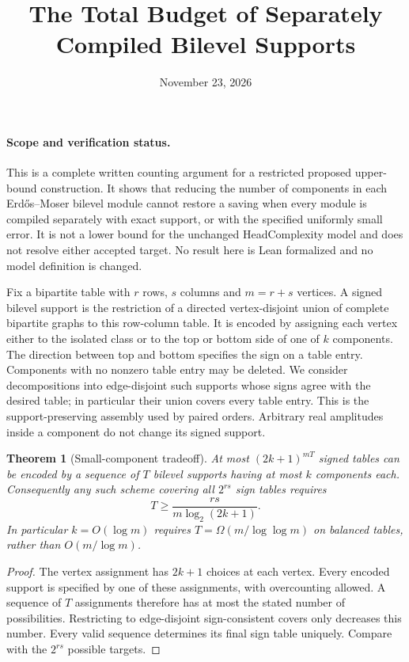 \documentclass[11pt]{article}
\title{The Total Budget of Separately Compiled Bilevel Supports}
\author{}
\date{November 23, 2026}
\newtheorem{theorem}{Theorem}
\begin{document}
\maketitle

\paragraph{Scope and verification status.}
This is a complete written counting argument for a restricted proposed
upper-bound construction. It shows that reducing the number of components
in each Erd\H{o}s--Moser bilevel module cannot restore a saving when every
module is compiled separately with exact support, or with the specified
uniformly small error. It is not a lower bound for the unchanged
HeadComplexity model and does not resolve either accepted target.
No result here is Lean formalized and no model definition is changed.

Fix a bipartite table with $r$ rows, $s$ columns and $m=r+s$ vertices.
A signed bilevel support is the restriction of a directed vertex-disjoint
union of complete bipartite graphs to this row-column table. It is encoded
by assigning each vertex either to the isolated class or to the top or
bottom side of one of $k$ components. The direction between top and bottom
specifies the sign on a table entry. Components with no nonzero table
entry may be deleted. We consider decompositions into edge-disjoint such
supports whose signs agree with the desired table; in particular their
union covers every table entry. This is the support-preserving assembly
used by paired orders. Arbitrary real amplitudes inside a component do
not change its signed support.

\begin{theorem}[Small-component tradeoff]
At most $(2k+1)^{mT}$ signed tables can be encoded by a sequence of $T$
bilevel supports having at most $k$ components each. Consequently any such
scheme covering all $2^{rs}$ sign tables requires
\[
 T\geq \frac{rs}{m\log_2(2k+1)}.
\]
In particular $k=O(\log m)$ requires $T=\Omega(m/\log\log m)$ on
balanced tables, rather than $O(m/\log m)$.
\end{theorem}
\begin{proof}
The vertex assignment has $2k+1$ choices at each vertex. Every encoded
support is specified by one of these assignments, with overcounting
allowed. A sequence of $T$ assignments therefore has at most the stated
number of possibilities. Restricting to edge-disjoint sign-consistent
covers only decreases this number. Every valid sequence determines its
final sign table uniquely. Compare with the $2^{rs}$ possible targets.
\end{proof}
\end{document}
